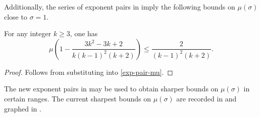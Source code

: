 \literature
{}

Additionally, the series of exponent pairs in  imply the following bounds on $\mu(\sigma)$ close to $\sigma = 1$. 
\begin{theorem}\label{hb_mu_bounds}
For any integer $k \ge 3$, one has
\[
\mu\left(1 - \frac{3 k^2 - 3 k + 2}{k(k - 1)^2(k + 2)}\right)\le \frac{2}{(k - 1)^2(k + 2)}.
\]
\end{theorem}
\begin{proof}
Follows from substituting  into \eqref{exp-pair-mu}.
\end{proof}


The new exponent pairs in  may be used to obtain sharper bounds on $\mu(\sigma)$ in certain ranges. The current sharpest bounds on $\mu(\sigma)$ are recorded in  and graphed in .



